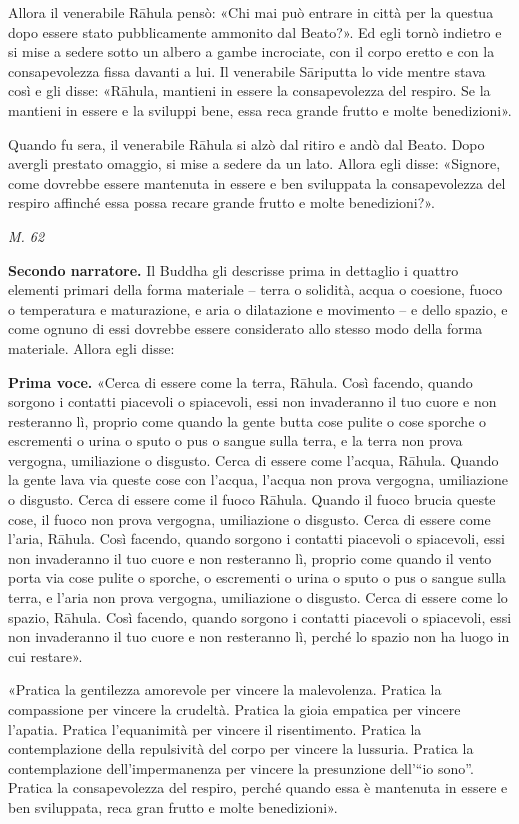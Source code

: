Allora il venerabile Rāhula pensò: «Chi mai può entrare in città per la
questua dopo essere stato pubblicamente ammonito dal Beato?». Ed egli
tornò indietro e si mise a sedere sotto un albero a gambe incrociate,
con il corpo eretto e con la consapevolezza fissa davanti a lui. Il
venerabile Sāriputta lo vide mentre stava così e gli disse: «Rāhula,
mantieni in essere la consapevolezza del respiro. Se la mantieni in
essere e la sviluppi bene, essa reca grande frutto e molte benedizioni».


Quando fu sera, il venerabile Rāhula si alzò dal ritiro e andò dal
Beato. Dopo avergli prestato omaggio, si mise a sedere da un lato.
Allora egli disse: «Signore, come dovrebbe essere mantenuta in essere e
ben sviluppata la consapevolezza del respiro affinché essa possa recare
grande frutto e molte benedizioni?».


\emph{M. 62}


\textbf{Secondo narratore.} Il Buddha gli descrisse prima in dettaglio i quattro
elementi primari della forma materiale – terra o solidità, acqua o
coesione, fuoco o temperatura e maturazione, e aria o dilatazione e
movimento – e dello spazio, e come ognuno di essi dovrebbe essere
considerato allo stesso modo della forma materiale. Allora egli disse:


\textbf{Prima voce.} «Cerca di essere come la terra, Rāhula. Così facendo, quando
sorgono i contatti piacevoli o spiacevoli, essi non invaderanno il tuo
cuore e non resteranno lì, proprio come quando la gente butta cose
pulite o cose sporche o escrementi o urina o sputo o pus o sangue sulla
terra, e la terra non prova vergogna, umiliazione o disgusto. Cerca di
essere come l’acqua, Rāhula. Quando la gente lava via queste cose con
l’acqua, l’acqua non prova vergogna, umiliazione o disgusto. Cerca di
essere come il fuoco Rāhula. Quando il fuoco brucia queste cose, il
fuoco non prova vergogna, umiliazione o disgusto. Cerca di essere come
l’aria, Rāhula. Così facendo, quando sorgono i contatti piacevoli o
spiacevoli, essi non invaderanno il tuo cuore e non resteranno lì,
proprio come quando il vento porta via cose pulite o sporche, o
escrementi o urina o sputo o pus o sangue sulla terra, e l’aria non
prova vergogna, umiliazione o disgusto. Cerca di essere come lo spazio,
Rāhula. Così facendo, quando sorgono i contatti piacevoli o spiacevoli,
essi non invaderanno il tuo cuore e non resteranno lì, perché lo spazio
non ha luogo in cui restare».


«Pratica la gentilezza amorevole per vincere la malevolenza. Pratica la
compassione per vincere la crudeltà. Pratica la gioia empatica per
vincere l’apatia. Pratica l’equanimità per vincere il risentimento.
Pratica la contemplazione della repulsività del corpo per vincere la
lussuria. Pratica la contemplazione dell’impermanenza per vincere la
presunzione dell’“io sono”. Pratica la consapevolezza del respiro,
perché quando essa è mantenuta in essere e ben sviluppata, reca gran
frutto e molte benedizioni».


